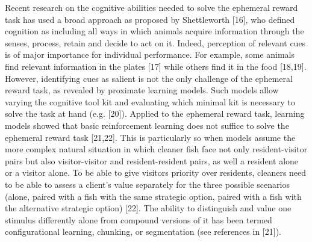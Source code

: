 \documentclass[10pt,letterpaper]{article}
\begin{document}
Recent research on the cognitive abilities needed to solve the ephemeral
reward task has used a broad approach as proposed by Shettleworth
{[}16{]}, who defined cognition as including all ways in which animals
acquire information through the senses, process, retain and decide to
act on it. Indeed, perception of relevant cues is of major importance
for individual performance. For example, some animals find relevant
information in the plates {[}17{]} while others find it in the food
{[}18,19{]}. However, identifying cues as salient is not the only
challenge of the ephemeral reward task, as revealed by proximate
learning models. Such models allow varying the cognitive tool kit and
evaluating which minimal kit is necessary to solve the task at hand
(e.g. {[}20{]}). Applied to the ephemeral reward task, learning models
showed that basic reinforcement learning does not suffice to solve the
ephemeral reward task {[}21,22{]}. This is particularly so when models
assume the more complex natural situation in which cleaner fish face not
only resident-visitor pairs but also visitor-visitor and
resident-resident pairs, as well a resident alone or a visitor alone. To
be able to give visitors priority over residents, cleaners need to be
able to assess a client's value separately for the three possible
scenarios (alone, paired with a fish with the same strategic option,
paired with a fish with the alternative strategic option) {[}22{]}. The
ability to distinguish and value one stimulus differently alone from
compound versions of it has been termed configurational learning,
chunking, or segmentation (see references in {[}21{]}).
\end{document}
